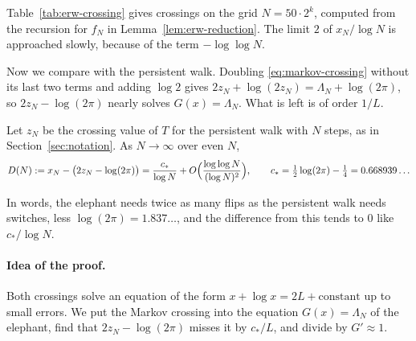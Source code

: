 Table~\ref{tab:erw-crossing} gives crossings on the grid
$N=50\cdot2^k$, computed from the recursion for $f_N$ in
Lemma~\ref{lem:erw-reduction}. The limit $2$ of $x_N/\log N$ is approached
slowly, because of the term $-\log\log N$.

Now we compare with the persistent walk. Doubling \eqref{eq:markov-crossing}
without its last two terms and adding $\log2$ gives $2z_N+\log(2z_N)=\Lambda_N+\log(2\pi)$, so
$2z_N-\log(2\pi)$ nearly solves $G(x)=\Lambda_N$. What is left is of order
$1/L$.

\begin{theorem}\label{thm:erw-markov}
Let $z_N$ be the crossing value of $T$ for the persistent walk with $N$ steps, as
in Section~\ref{sec:notation}. As $N\to\infty$ over even $N$,
\[
 D(N):=x_N-\bigl(2z_N-\log(2\pi)\bigr)=\frac{c_*}{\log N}
 +O\Bigl(\frac{\log\log N}{(\log N)^2}\Bigr),\qquad
 c_*=\tfrac12\log(2\pi)-\tfrac14=0.668939\ldots
\]
\end{theorem}

In words, the elephant needs twice as many flips as the persistent walk needs
switches, less $\log(2\pi)=1.837\ldots$, and the difference from this tends
to 0 like $c_*/\log N$.

\paragraph{Idea of the proof.}
Both crossings solve an equation of the form $x+\log x=2L+\text{constant}$
up to small errors. We put the Markov crossing into the equation
$G(x)=\Lambda_N$ of the elephant, find that $2z_N-\log(2\pi)$ misses it by
$c_*/L$, and divide by $G'\approx1$.

